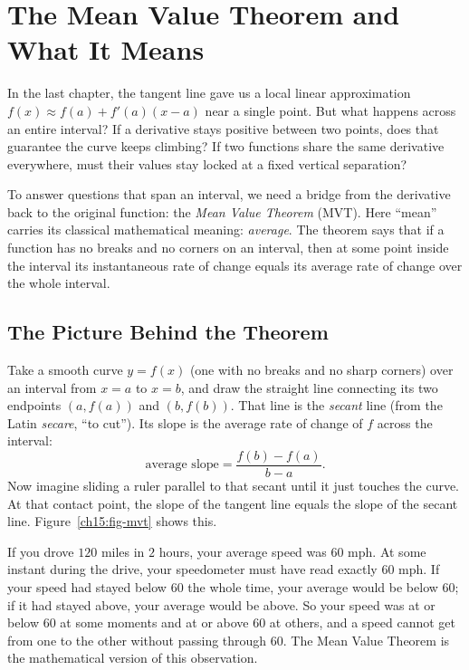 \chapter{The Mean Value Theorem and What It Means}

In the last chapter, the tangent line gave us a local linear approximation
$f(x)\approx f(a)+f'(a)(x-a)$ near a single point. But what happens across an
entire interval? If a derivative stays positive between two points, does that
guarantee the curve keeps climbing? If two functions share the same derivative
everywhere, must their values stay locked at a fixed vertical separation?

To answer questions that span an interval, we need a bridge from the derivative back
to the original function: the \emph{Mean Value Theorem} (MVT). Here ``mean'' carries
its classical mathematical meaning: \emph{average}. The theorem says that if a
function has no breaks and no corners on an interval, then at some point inside the
interval its instantaneous rate of change equals its average rate of change over the
whole interval.

\section{The Picture Behind the Theorem}

Take a smooth curve $y=f(x)$ (one with no breaks and no sharp corners) over an
interval from $x=a$ to $x=b$, and draw the straight line connecting its two endpoints
$(a,f(a))$ and $(b,f(b))$. That line is the \emph{secant} line (from the Latin
\emph{secare}, ``to cut''). Its slope is the average rate of change of $f$ across the
interval:
\[
  \text{average slope} = \frac{f(b)-f(a)}{b-a}.
\]
Now imagine sliding a ruler parallel to that secant until it just touches the
curve. At that contact point, the slope of the tangent line equals the slope of the
secant line. Figure~\ref{ch15:fig-mvt} shows this.

\begin{intuitionbox}
If you drove $120$ miles in $2$ hours, your average speed was $60$ mph. At some
instant during the drive, your speedometer must have read exactly $60$ mph. If your
speed had stayed below $60$ the whole time, your average would be below $60$; if it
had stayed above, your average would be above. So your speed was at or below $60$ at
some moments and at or above $60$ at others, and a speed cannot get from one to the
other without passing through $60$. The Mean Value Theorem is the mathematical
version of this observation.
\end{intuitionbox}

